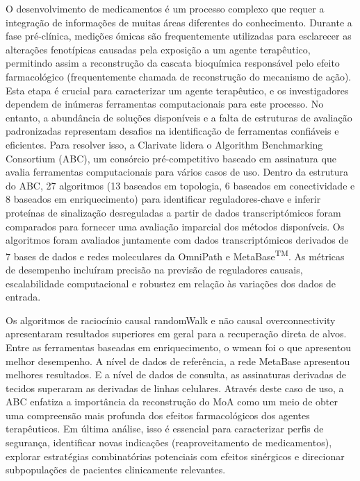 ﻿%

%

O desenvolvimento de medicamentos é um processo complexo que requer a integração de informações de muitas áreas diferentes do conhecimento.
Durante a fase pré-clínica, medições ómicas são frequentemente utilizadas para esclarecer as alterações fenotípicas causadas pela exposição a um agente terapêutico, permitindo assim a reconstrução da cascata bioquímica responsável pelo efeito farmacológico (frequentemente chamada de reconstrução do mecanismo de ação).
Esta etapa é crucial para caracterizar um agente terapêutico, e os investigadores dependem de inúmeras ferramentas computacionais para este processo.
No entanto, a abundância de soluções disponíveis e a falta de estruturas de avaliação padronizadas representam desafios na identificação de ferramentas confiáveis e eficientes.
Para resolver isso, a Clarivate lidera o Algorithm Benchmarking Consortium (ABC), um consórcio pré-competitivo baseado em assinatura que avalia ferramentas computacionais para vários casos de uso.
Dentro da estrutura do ABC, 27 algoritmos (13 baseados em topologia, 6 baseados em conectividade e 8 baseados em enriquecimento) para identificar reguladores-chave e inferir proteínas de sinalização desreguladas a partir de dados transcriptómicos foram comparados para fornecer uma avaliação imparcial dos métodos disponíveis.
Os algoritmos foram avaliados juntamente com dados transcriptómicos derivados de 7 bases de dados e redes moleculares da OmniPath e MetaBase\textsuperscript{TM}.
As métricas de desempenho incluíram precisão na previsão de reguladores causais, escalabilidade computacional e robustez em relação às variações dos dados de entrada.

Os algoritmos de raciocínio causal randomWalk e não causal overconnectivity apresentaram resultados superiores em geral para a recuperação direta de alvos.
Entre as ferramentas baseadas em enriquecimento, o wmean foi o que apresentou melhor desempenho.
A nível de dados de referência, a rede MetaBase apresentou melhores resultados. E a nível de dados de consulta, as assinaturas derivadas de tecidos superaram as derivadas de linhas celulares.
Através deste caso de uso, a ABC enfatiza a importância da reconstrução do MoA como um meio de obter uma compreensão mais profunda dos efeitos farmacológicos dos agentes terapêuticos.
Em última análise, isso é essencial para caracterizar perfis de segurança, identificar novas indicações (reaproveitamento de medicamentos), explorar estratégias combinatórias potenciais com efeitos sinérgicos e direcionar subpopulações de pacientes clinicamente relevantes.


